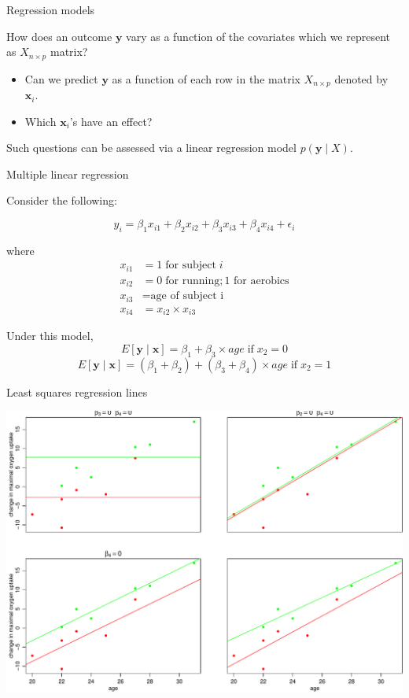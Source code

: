 \documentclass[
  ignorenonframetext,
]{beamer}
\providecommand{\tightlist}{%
  \setlength{\itemsep}{0pt}\setlength{\parskip}{0pt}}
\newcommand{\bx}   {\bm{x}}
\newcommand{\by}   {\bm{y}}
\begin{document}
\begin{frame}{Regression models}
\protect\hypertarget{regression-models}{}

How does an outcome \(\bm{y}\) vary as a function of the covariates
which we represent as \(X_{n\times p}\) matrix?

\begin{itemize}
\tightlist
\item
  Can we predict \(\bm{y}\) as a function of each row in the matrix
  \(X_{n\times p}\) denoted by \(\bx_i.\)
\item
  Which \(\bx_i\)'s have an effect?
\end{itemize}

Such questions can be assessed via a linear regression model
\(p(\by \mid X).\)

\end{frame}

\begin{frame}{Multiple linear regression}
\protect\hypertarget{multiple-linear-regression}{}

Consider the following:

\[y_i = \beta_1 x_{i1} + \beta_2 x_{i2} + \beta_3 x_{i3} + 
\beta_4 x_{i4} + \epsilon_i\]

where \begin{align}
x_{i1} &= 1 \; \text{for subject} \; i \\
x_{i2} &= 0 \; \text{for running}; \text{1 for aerobics}  \\
x_{i3} &= \text{age of subject i}\\
x_{i4} &= x_{i2} \times x_{i3} 
\end{align}

Under this model,
\[E[\bm{y} \mid \bm{x}] = \beta_1 + \beta_3 \times age \; \text{if} \; x_2=0\]
\[E[\bm{y} \mid \bm{x}] = (\beta_1 + \beta_2) + (\beta_3 + \beta_4)\times age \; \text{if} \; x_2=1 \]

\end{frame}

\begin{frame}{Least squares regression lines}
\protect\hypertarget{least-squares-regression-lines}{}

\includegraphics{9-linear-regression_files/figure-beamer/unnamed-chunk-3-1.pdf}

\end{frame}
\end{document}
